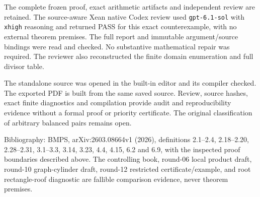\documentclass[
  10pt,
]{article}
\begin{document}
The complete frozen proof, exact arithmetic artifacts and independent
review are retained. The source-aware Xean native Codex review used
\texttt{gpt-6.1-sol} with \texttt{xhigh} reasoning and returned PASS
for this exact counterexample, with no external theorem premises. The
full report and immutable argument/source bindings were read and checked.
No substantive mathematical repair was required. The reviewer also
reconstructed the finite domain enumeration and full divisor table.

The standalone source was opened in the built-in editor and its compiler
checked. The exported PDF is built from the same saved source. Review,
source hashes, exact finite diagnostics and compilation provide audit
and reproducibility evidence without a formal proof or priority certificate.
The original classification of arbitrary balanced pairs remains open.

Bibliography: BMPS, arXiv:2603.08664v1 (2026), definitions 2.1--2.4,
2.18--2.20, 2.28--2.31, 3.1--3.3, 3.14, 3.23, 4.4, 4.15, 6.2 and 6.9,
with the inspected proof boundaries described above. The controlling
book, round-06 local product draft, round-10 graph-cylinder draft,
round-12 restricted certificate/example, and root rectangle-roof
diagnostic are fallible comparison evidence, never theorem premises.
\end{document}
